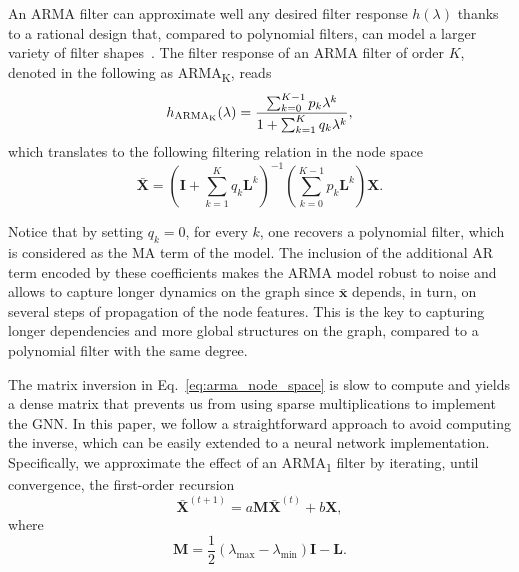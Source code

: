 \documentclass{article}
\def\x{{\mathbf x}}
\def\X{{\mathbf X}}
\def\L{{\mathbf L}}
\def\I{{\mathbf I}}
\def\L{{\mathbf L}}
\begin{document}
An ARMA filter can approximate well any desired filter response $h(\lambda)$ thanks to a rational design that, compared to polynomial filters, can model a larger variety of filter shapes~\cite{tremblay2018design}.
The filter response of an ARMA filter of order $K$, denoted in the following as ARMA\textsubscript{K}, reads
\begin{equation}
 \label{eq:arma_transfer}
 h_\text{ARMA\textsubscript{K}}(\lambda) = \frac{\sum_{k=0}^{K-1} p_k \lambda^k}{1 + \sum_{k=1}^K q_k \lambda^k},
\end{equation}
which translates to the following filtering relation in the node space
\begin{equation}
 \label{eq:arma_node_space}
 \bar \X = \left(\I + \sum_{k=1}^K q_k \L^k \right)^{-1} \left( \sum_{k=0}^{K-1} p_k \L^k \right) \X.
\end{equation}














Notice that by setting $q_k = 0$, for every $k$, one recovers a polynomial filter, which is considered as the MA term of the model. The inclusion of the additional AR term encoded by these coefficients makes the ARMA model robust to noise and allows to capture longer dynamics on the graph since $\bar{\x}$ depends, in turn, on several steps of propagation of the node features.
This is the key to capturing longer dependencies and more global structures on the graph, compared to a polynomial filter with the same degree.


The matrix inversion in Eq.~\eqref{eq:arma_node_space} is slow to compute and yields a dense matrix that prevents us from using sparse multiplications to implement the GNN.
In this paper, we follow a straightforward approach to avoid computing the inverse, which can be easily extended to a neural network implementation.
Specifically, we approximate the effect of an ARMA\textsubscript{1} filter by iterating, until convergence, the first-order recursion
\begin{equation}
\label{eq:recursive_arma}
    \bar{\X}^{(t+1)} = a \mathbf{M}\bar{\X}^{(t)} + b\X,
\end{equation}
where 
\begin{equation}
\label{eq:M}
    \mathbf{M} = \frac{1}{2}(\lambda_\text{max} - \lambda_\text{min}) \I - \L.
\end{equation}
\end{document}
